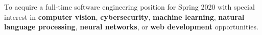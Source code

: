 

\begin{cvparagraph}

To acquire a full-time software engineering position for Spring 2020 with
special interest in \textbf{computer vision}, \textbf{cybersecurity},
\textbf{machine learning}, \textbf{natural language processing},
\textbf{neural networks}, or \textbf{web development} opportunities.

\end{cvparagraph}
